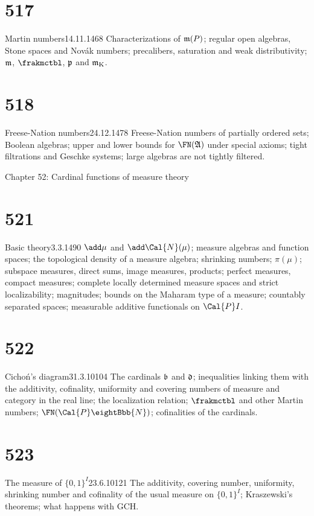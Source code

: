 \section{517}{Martin numbers}{14.11.14}{}{68}
{Characterizations of $\frak{m}(P)$;  regular open algebras, Stone spaces
and Nov\'ak numbers;  precalibers, saturation and weak
distributivity;  $\frak{m}$,
$\frakmctbl$, $\frak{p}$ and $\frak{m}_{\text{K}}$.}

\section{518}{Freese-Nation numbers}{24.12.14}{}{78}
{Freese-Nation numbers of partially ordered sets;  Boolean algebras;
upper and lower bounds for $\FN(\frak{A})$ under special axioms;  tight
filtrations and Geschke systems;  large algebras are not tightly
filtered.}


Chapter 52:  Cardinal functions of measure theory


\section{521}{Basic theory}{3.3.14}{}{90}
{$\add\mu$ and $\add\Cal{N}(\mu)$;  measure algebras and function spaces;
the topological density of a measure algebra;
shrinking numbers;  $\pi(\mu)$;
subspace measures, direct sums, image measures,
products;  perfect measures, compact measures;
complete locally determined measure spaces and strict localizability;
magnitudes;  bounds on the Maharam type of a measure;
countably separated spaces;  measurable additive
functionals on $\Cal{P}I$.}

\section{522}{Cicho\'n's diagram}{31.3.10}{}{104}
{The cardinals $\frak{b}$ and $\frak{d}$;  inequalities linking them with
the additivity, cofinality, uniformity and covering numbers of measure
and category in the real line;  the localization relation;
$\frakmctbl$ and other Martin numbers;  $\FN(\Cal{P}\eightBbb{N})$;
cofinalities of the cardinals.}

\section{523}{The measure of $\{0,1\}^I$}{23.6.10}{}{121}
{The additivity, covering number, uniformity, shrinking number and
cofinality of the usual measure on $\{0,1\}^I$;  Kraszewski's theorems;
what happens with GCH.}

